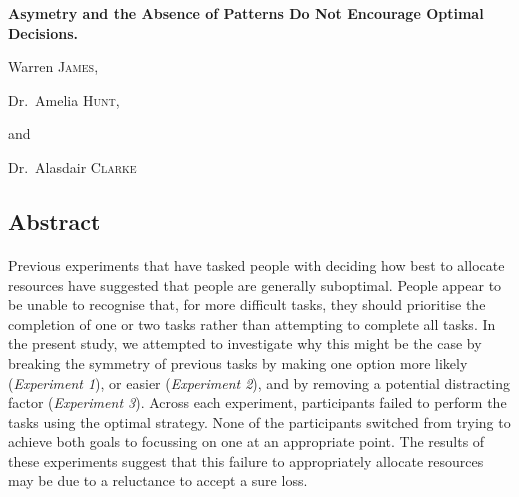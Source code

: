 \documentclass[12pt]{article}
\begin{document}
\begin{titlepage}
	\centering
	{\huge\bfseries Asymetry and the Absence of Patterns Do Not Encourage Optimal Decisions.\par}
	\vspace{1cm}
	Warren \textsc{James}, \par
	Dr.~Amelia \textsc{Hunt},\par
	and\par
	Dr.~Alasdair \textsc{Clarke}
	\vfill
\end{titlepage}	


\newpage
\begin{center}
\section*{Abstract}
\paragraph{} Previous experiments that have tasked people with deciding how best to allocate resources have suggested that people are generally suboptimal. People appear to be unable to recognise that, for more difficult tasks, they should prioritise the completion of one or two tasks rather than attempting to complete all tasks. In the present study, we attempted to investigate why this might be the case by breaking the symmetry of previous tasks by making one option more likely (\textit{Experiment 1}), or easier (\textit{Experiment 2}), and by removing a potential distracting factor (\textit{Experiment 3}). Across each experiment, participants failed to perform the tasks using the optimal strategy. None of the participants switched from trying to achieve both goals to focussing on one at an appropriate point. The results of these experiments suggest that this failure to appropriately allocate resources may be due to a reluctance to accept a sure loss. 
\end{center}

\end{document}
